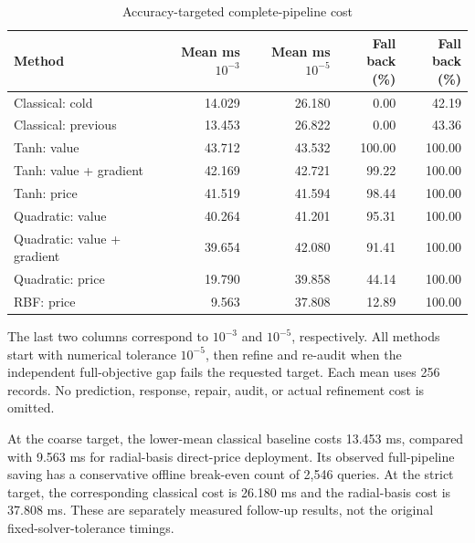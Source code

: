 \documentclass[11pt,letterpaper]{article}
\theoremstyle{definition}
\newcommand{\1}{\mathbf 1}
\begin{document}
\begin{table}[p]
\centering
\caption{Accuracy-targeted complete-pipeline cost}\label{tab:r19-cost}
\setlength{\tabcolsep}{4pt}
\begin{tabular}{lrrrr}
\toprule
Method & \shortstack{Mean ms\\$10^{-3}$} & \shortstack{Mean ms\\$10^{-5}$} & \shortstack{Fall back\\(\%)} & \shortstack{Fall back\\(\%)} \\
\midrule
Classical: cold & 14.029 & 26.180 & 0.00 & 42.19 \\
Classical: previous & 13.453 & 26.822 & 0.00 & 43.36 \\
Tanh: value & 43.712 & 43.532 & 100.00 & 100.00 \\
Tanh: value + gradient & 42.169 & 42.721 & 99.22 & 100.00 \\
Tanh: price & 41.519 & 41.594 & 98.44 & 100.00 \\
Quadratic: value & 40.264 & 41.201 & 95.31 & 100.00 \\
Quadratic: value + gradient & 39.654 & 42.080 & 91.41 & 100.00 \\
Quadratic: price & 19.790 & 39.858 & 44.14 & 100.00 \\
RBF: price & 9.563 & 37.808 & 12.89 & 100.00 \\
\bottomrule
\end{tabular}

\par\medskip\begin{minipage}{\textwidth}The last two columns correspond to $10^{-3}$ and $10^{-5}$, respectively. All methods start with numerical tolerance $10^{-5}$, then refine and re-audit when the independent full-objective gap fails the requested target. Each mean uses 256 records. No prediction, response, repair, audit, or actual refinement cost is omitted.\end{minipage}
\end{table}


At the coarse target, the lower-mean classical baseline costs 13.453 ms, compared with 9.563 ms for radial-basis direct-price deployment. Its observed full-pipeline saving has a conservative offline break-even count of 2,546 queries. At the strict target, the corresponding classical cost is 26.180 ms and the radial-basis cost is 37.808 ms. These are separately measured follow-up results, not the original fixed-solver-tolerance timings.
\end{document}
